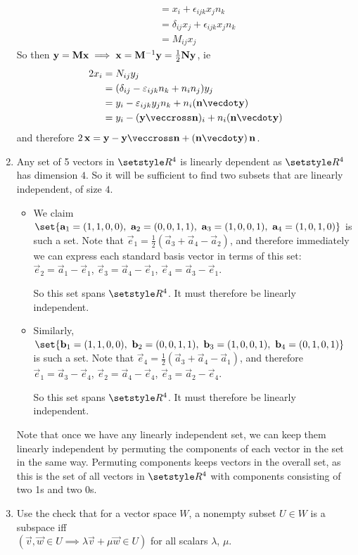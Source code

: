 \documentclass[fleqn,a4paper,11pt]{article}
\begin{document}
\begin{enumerate}[label=\textbf{\arabic*.}]
\begin{alignat*}
    &&           &= x_i + \epsilon_{ijk} x_j n_k \\
    &&           &= \delta_{ij} x_j + \epsilon_{ijk} x_j n_k \\
    &&           &=  M_{ij} x_j
   \end{alignat*}
   So then \(\mathrm{\mathbf{y}} = \mathbf{M} \mathrm{\mathbf{x}} \implies
    \mathrm{\mathbf{x}} = \mathbf{M}^{-1} \mathrm{\mathbf{y}} = \frac 12 \mathbf{N} \mathrm{\mathbf{y}}\), ie
   \begin{align*}
    2 x_i &=  N_{ij} y_j \\
          &= (\delta_{ij} - \epsilon_{ijk} n_k + n_i n_j) y_j \\
          &= y_i - \epsilon_{ijk} y_j n_k + n_i(\vec n \vecdot \vec y) \\
          &= y_i - (\vec y \veccross \vec n)_i + n_i(\vec n \vecdot \vec y)
   \end{align*}
   and therefore
   \(2\,\vec x
     = \vec y - \vec y \veccross \vec n + (\vec n \vecdot \vec y)\,\vec n\).
   \item
    Any set of 5 vectors in \(\Reals^4\) is linearly dependent as
    \(\Reals^4\) has dimension \(4\). So it will be sufficient to find two
    subsets that are linearly independent, of size \(4\).
    \begin{itemize}
     \item
      We claim
      \(\set{\vec a_1 = (1, 1, 0, 0),\ \vec a_2 = (0, 0, 1, 1),
           \ \vec a_3 = (1, 0, 0, 1),\ \vec a_4 = (1, 0, 1, 0)}\)
      is such a set. Note that
      \(\vec e_1 = \frac 12 (\vec a_3 + \vec a_4 - \vec a_2)\), and therefore
      immediately we can express each standard basis vector in terms of this
      set:
      \(\vec e_2 = \vec a_1 - \vec e_1\),
      \(\vec e_3 = \vec a_4 - \vec e_1\),
      \(\vec e_4 = \vec a_3 - \vec e_1\).

      So this set spans \(\Reals^4\). It must therefore be linearly independent.
     \item
      Similarly,
      \(\set{\vec b_1 = (1, 1, 0, 0),\ \vec b_2 = (0, 0, 1, 1),
           \ \vec b_3 = (1, 0, 0, 1),\ \vec b_4 = (0, 1, 0, 1)}\)
      is such a set. Note that
      \(\vec e_4 = \frac 12 (\vec a_3 + \vec a_4 - \vec a_1)\), and therefore
      \(\vec e_1 = \vec a_3 - \vec e_4\),
      \(\vec e_2 = \vec a_4 - \vec e_4\),
      \(\vec e_3 = \vec a_2 - \vec e_4\).

      So this set spans \(\Reals^4\). It must therefore be linearly independent.
    \end{itemize}
    Note that once we have any linearly independent set, we can keep them
    linearly independent by permuting the components of each vector in the set
    in the same way. Permuting components keeps vectors in the overall set, as
    this is the set of all vectors in \(\Reals^4\) with components consisting of
    two 1s and two 0s.
   \item
    Use the check that for a vector space \(W\), a nonempty subset \(U \in W\)
    is a subspace iff
    \\ \((\vec v, \vec w \in U \implies \lambda \vec v + \mu \vec w \in U)\) for
    all scalars \(\lambda\), \(\mu\).


\end{enumerate}
\end{document}
